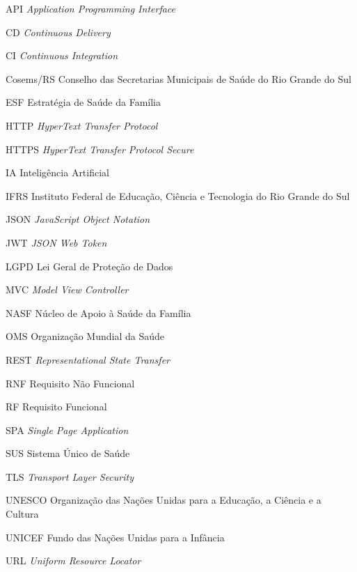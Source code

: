 \begin{siglas}
  \item[API] \textit{Application Programming Interface}
  \item[CD] \textit{Continuous Delivery}
  \item[CI] \textit{Continuous Integration}
  \item[Cosems/RS] Conselho das Secretarias Municipais de Saúde do Rio Grande do Sul
  \item[ESF] Estratégia de Saúde da Família
  \item[HTTP] \textit{HyperText Transfer Protocol}
  \item[HTTPS] \textit{HyperText Transfer Protocol Secure}
  \item[IA] Inteligência Artificial
  \item[IFRS] Instituto Federal de Educação, Ciência e Tecnologia do Rio Grande do Sul
  \item[JSON] \textit{JavaScript Object Notation}
  \item[JWT] \textit{JSON Web Token}
  \item[LGPD] Lei Geral de Proteção de Dados
  \item[MVC] \textit{Model View Controller}
  \item[NASF] Núcleo de Apoio à Saúde da Família
  \item[OMS] Organização Mundial da Saúde
  \item[REST] \textit{Representational State Transfer}
  \item[RNF] Requisito Não Funcional
  \item[RF] Requisito Funcional
  \item[SPA] \textit{Single Page Application}
  \item[SUS] Sistema Único de Saúde
  \item[TLS] \textit{Transport Layer Security}
  \item[UNESCO] Organização das Nações Unidas para a Educação, a Ciência e a Cultura
  \item[UNICEF] Fundo das Nações Unidas para a Infância
  \item[URL] \textit{Uniform Resource Locator}
\end{siglas}

